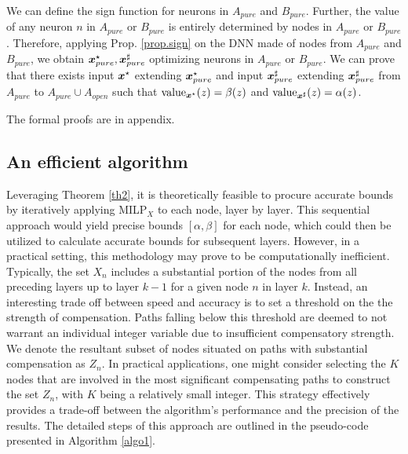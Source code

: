 We can define the sign function for neurons in $A_{pure}$ and $B_{pure}$.
Further, the value of any neuron $n$ in $A_{pure}$ or $B_{pure}$ is entirely determined by 
nodes in $A_{pure}$ or $B_{pure}$. Therefore, applying Prop. \ref{prop.sign} on the DNN
made of nodes from $A_{pure}$ and $B_{pure}$, we obtain 
$\boldsymbol{x}_{pure}^\star,\boldsymbol{x}_{pure}^\sharp$ optimizing neurons in $A_{pure}$ or $B_{pure}$.
We can prove that there exists input 
$\boldsymbol{x}^\star$ extending $\boldsymbol{x}_{pure}^\star$
and input $\boldsymbol{x}_{pure}^\sharp$ extending $\boldsymbol{x}_{pure}^\sharp$
from $A_{pure}$ to $A_{pure} \cup A_{open}$ such that 
${\textrm{value}}_{\boldsymbol{x}^\star}(z)=\beta(z)$ and ${\textrm{value}}_{\boldsymbol{x}^\sharp}(z)=\alpha(z)$.

The formal proofs are in appendix.


\subsection{An efficient algorithm}


Leveraging Theorem \ref{th2}, it is theoretically feasible to procure accurate bounds by iteratively applying MILP$_{X}$ to each node, layer by layer. This sequential approach would yield precise bounds $[\alpha,\beta]$ for each node, which could then be utilized to calculate accurate bounds for subsequent layers. However, in a practical setting, this methodology may prove to be computationally inefficient. Typically, the set $X_n$ includes a substantial portion of the nodes from all preceding layers up to layer $k-1$ for a given node $n$ in layer $k$. Instead, an interesting trade off between speed and accuracy is to set a threshold on the the strength of compensation. Paths falling below this threshold are deemed to not warrant an individual integer variable due to insufficient compensatory strength. We denote the resultant subset of nodes situated on paths with substantial compensation as $Z_n$. In practical applications, one might consider selecting the $K$ nodes that are involved in the most significant compensating paths to construct the set $Z_n$, with $K$ being a relatively small integer. This strategy effectively provides a trade-off between the algorithm's performance and the precision of the results. The detailed steps of this approach are outlined in the pseudo-code presented in Algorithm \ref{algo1}.






